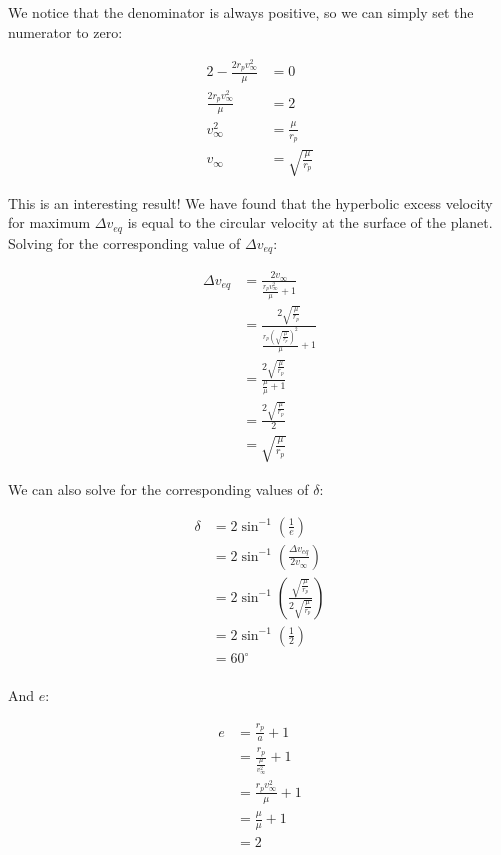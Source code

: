 We notice that the denominator is always positive, so we can simply set the numerator to zero:

\begin{align*}
    2 - \frac{2r_p v_\infty^2}{\mu} &= 0 \\
    \frac{2r_p v_\infty^2}{\mu} &= 2 \\
    v_\infty^2 &= \frac{\mu}{r_p} \\
    v_\infty &= \sqrt{\frac{\mu}{r_p}}
\end{align*}

This is an interesting result! We have found that the hyperbolic excess velocity for maximum $\Delta v_{eq}$ is equal to the circular velocity at the surface of the planet. Solving for the corresponding value of $\Delta v_{eq}$:

\begin{align*}
    \Delta v_{eq} &= \frac{2 v_\infty}{\frac{r_p v_\infty^2}{\mu} + 1} \\
    &= \frac{2 \sqrt{\frac{\mu}{r_p}}}{\frac{r_p \left( \sqrt{\frac{\mu}{r_p}} \right)^2}{\mu} + 1} \\
    &= \frac{2 \sqrt{\frac{\mu}{r_p}}}{\frac{\mu}{\mu} + 1} \\
    &= \frac{2 \sqrt{\frac{\mu}{r_p}}}{2} \\
    &= \sqrt{\frac{\mu}{r_p}}
\end{align*}

We can also solve for the corresponding values of $\delta$:

\begin{align*}
    \delta &= 2 \sin^{-1} \left( \frac{1}{e} \right) \\
    &= 2 \sin^{-1} \left( \frac{\Delta v_{eq}}{2 v_\infty} \right) \\
    &= 2 \sin^{-1} \left( \frac{\sqrt{\frac{\mu}{r_p}}}{2 \sqrt{\frac{\mu}{r_p}}} \right) \\
    &= 2 \sin^{-1} \left( \frac{1}{2} \right) \\
    &= 60^\circ \\
\end{align*}

And $e$:

\begin{align*}
    e &= \frac{r_p}{a} + 1 \\
    &= \frac{r_p}{\frac{\mu}{v_\infty^2}} + 1 \\
    &= \frac{r_p v_\infty^2}{\mu} + 1 \\
    &= \frac{\mu}{\mu} + 1 \\
    &= 2
\end{align*}


